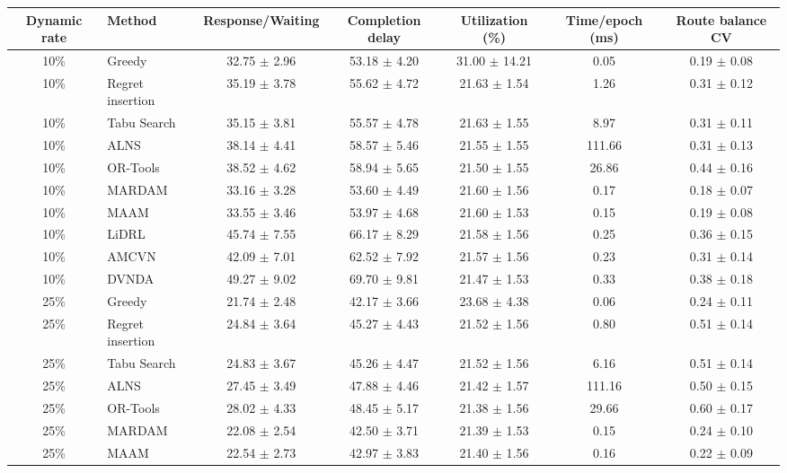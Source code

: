 \begin{tabular}{clccccc}
\toprule
Dynamic rate & Method & Response/Waiting & Completion delay & Utilization (\%) & Time/epoch (ms) & Route balance CV \\
\midrule
10\% & Greedy & 32.75 $\pm$ 2.96 & 53.18 $\pm$ 4.20 & 31.00 $\pm$ 14.21 & 0.05 & 0.19 $\pm$ 0.08 \\
10\% & Regret insertion & 35.19 $\pm$ 3.78 & 55.62 $\pm$ 4.72 & 21.63 $\pm$ 1.54 & 1.26 & 0.31 $\pm$ 0.12 \\
10\% & Tabu Search & 35.15 $\pm$ 3.81 & 55.57 $\pm$ 4.78 & 21.63 $\pm$ 1.55 & 8.97 & 0.31 $\pm$ 0.11 \\
10\% & ALNS & 38.14 $\pm$ 4.41 & 58.57 $\pm$ 5.46 & 21.55 $\pm$ 1.55 & 111.66 & 0.31 $\pm$ 0.13 \\
10\% & OR-Tools & 38.52 $\pm$ 4.62 & 58.94 $\pm$ 5.65 & 21.50 $\pm$ 1.55 & 26.86 & 0.44 $\pm$ 0.16 \\
10\% & MARDAM & 33.16 $\pm$ 3.28 & 53.60 $\pm$ 4.49 & 21.60 $\pm$ 1.56 & 0.17 & 0.18 $\pm$ 0.07 \\
10\% & MAAM & 33.55 $\pm$ 3.46 & 53.97 $\pm$ 4.68 & 21.60 $\pm$ 1.53 & 0.15 & 0.19 $\pm$ 0.08 \\
10\% & LiDRL & 45.74 $\pm$ 7.55 & 66.17 $\pm$ 8.29 & 21.58 $\pm$ 1.56 & 0.25 & 0.36 $\pm$ 0.15 \\
10\% & AMCVN & 42.09 $\pm$ 7.01 & 62.52 $\pm$ 7.92 & 21.57 $\pm$ 1.56 & 0.23 & 0.31 $\pm$ 0.14 \\
10\% & DVNDA & 49.27 $\pm$ 9.02 & 69.70 $\pm$ 9.81 & 21.47 $\pm$ 1.53 & 0.33 & 0.38 $\pm$ 0.18 \\
25\% & Greedy & 21.74 $\pm$ 2.48 & 42.17 $\pm$ 3.66 & 23.68 $\pm$ 4.38 & 0.06 & 0.24 $\pm$ 0.11 \\
25\% & Regret insertion & 24.84 $\pm$ 3.64 & 45.27 $\pm$ 4.43 & 21.52 $\pm$ 1.56 & 0.80 & 0.51 $\pm$ 0.14 \\
25\% & Tabu Search & 24.83 $\pm$ 3.67 & 45.26 $\pm$ 4.47 & 21.52 $\pm$ 1.56 & 6.16 & 0.51 $\pm$ 0.14 \\
25\% & ALNS & 27.45 $\pm$ 3.49 & 47.88 $\pm$ 4.46 & 21.42 $\pm$ 1.57 & 111.16 & 0.50 $\pm$ 0.15 \\
25\% & OR-Tools & 28.02 $\pm$ 4.33 & 48.45 $\pm$ 5.17 & 21.38 $\pm$ 1.56 & 29.66 & 0.60 $\pm$ 0.17 \\
25\% & MARDAM & 22.08 $\pm$ 2.54 & 42.50 $\pm$ 3.71 & 21.39 $\pm$ 1.53 & 0.15 & 0.24 $\pm$ 0.10 \\
25\% & MAAM & 22.54 $\pm$ 2.73 & 42.97 $\pm$ 3.83 & 21.40 $\pm$ 1.56 & 0.16 & 0.22 $\pm$ 0.09 \\

\end{tabular}
